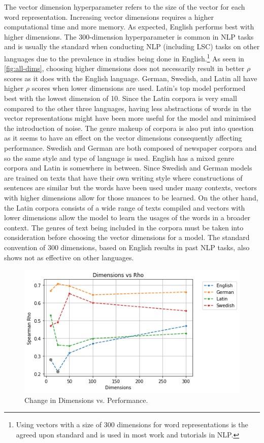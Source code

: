 The vector dimension hyperparameter refers to the size of the vector for each word representation. Increasing vector dimensions requires a higher computational time and more memory. As expected, English performs best with higher dimensions. The 300-dimension hyperparameter is common in NLP tasks and is usually the standard when conducting NLP (including LSC) tasks on other languages due to the prevalence in studies being done in English.\footnote{Using vectors with a size of 300 dimensions for word representations is the agreed upon standard and is used in most work and tutorials in NLP.} As seen in \autoref{fig:all-dims}, choosing higher dimensions does not necessarily result in better $\rho$ scores as it does with the English language. German, Swedish, and Latin all have higher $\rho$ scores when lower dimensions are used. Latin’s top model performed best with the lowest dimension of 10. Since the Latin corpora is very small compared to the other three languages, having less abstractions of words in the vector representations might have been more useful for the model and minimised the introduction of noise. The genre makeup of corpora is also put into question as it seems to have an effect on the vector dimensions consequently affecting performance. Swedish and German are both composed of newspaper corpora and so the same style and type of language is used. English has a mixed genre corpora and Latin is somewhere in between. Since Swedish and German models are trained on texts that have their own writing style where constructions of sentences are similar but the words have been used under many contexts, vectors with higher dimensions allow for those nuances to be learned. On the other hand, the Latin corpora consists of a wide range of texts compiled and vectors with lower dimensions allow the model to learn the usages of the words in a broader context. The genres of text being included in the corpora must be taken into consideration before choosing the vector dimensions for a model. The standard convention of 300 dimensions, based on English results in past NLP tasks, also shows not as effective on other languages.


\begin{figure}[h]
  \centering
  \includegraphics[width=.8\linewidth]{sections/figures/dims_all.png}
  \caption{Change in Dimensions vs. Performance.}
  \label{fig:all-dims}
\end{figure}

